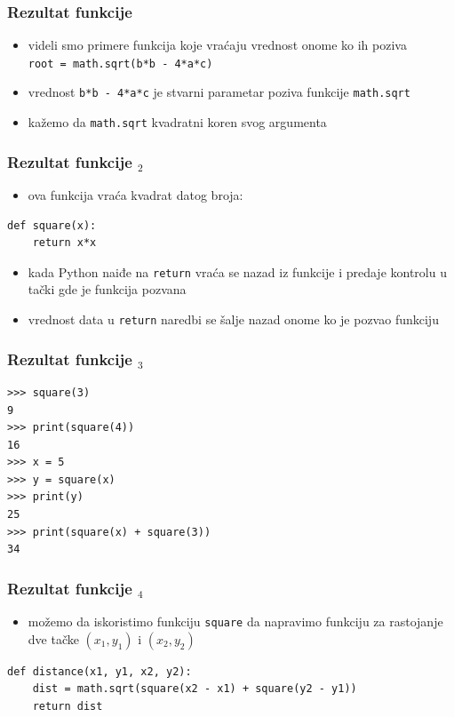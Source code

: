 \documentclass[compress]{beamer}
\begin{document}
\begin{frame}[fragile]
  \frametitle{Rezultat funkcije}
  \begin{itemize}
    \item videli smo primere funkcija koje vraćaju vrednost onome ko ih poziva \\
      \texttt{root = math.sqrt(b*b - 4*a*c)}
    \item vrednost \texttt{b*b - 4*a*c} je stvarni parametar poziva funkcije \texttt{math.sqrt}
    \item kažemo da \texttt{math.sqrt}  kvadratni koren svog argumenta
  \end{itemize}
\end{frame}

\begin{frame}[fragile]
  \frametitle{Rezultat funkcije $_2$}
  \begin{itemize}
    \item ova funkcija vraća kvadrat datog broja: \\
  \end{itemize}
\begin{verbatim}
def square(x):
    return x*x
\end{verbatim}
  \begin{itemize}
    \item kada Python naiđe na \texttt{return} vraća se nazad iz funkcije i predaje kontrolu u tački gde je funkcija pozvana
    \item vrednost data u \texttt{return} naredbi se šalje nazad onome ko je pozvao funkciju
  \end{itemize}
\end{frame}

\begin{frame}[fragile]
  \frametitle{Rezultat funkcije $_3$}
\begin{verbatim}
>>> square(3)
9
>>> print(square(4))
16
>>> x = 5
>>> y = square(x)
>>> print(y)
25
>>> print(square(x) + square(3))
34
\end{verbatim}
\end{frame}

\begin{frame}[fragile]
  \frametitle{Rezultat funkcije $_4$}
  \begin{itemize}
    \item možemo da iskoristimo funkciju \texttt{square} da napravimo funkciju za rastojanje dve tačke $(x_1,y_1)$ i $(x_2,y_2)$
  \end{itemize}
\begin{verbatim}
def distance(x1, y1, x2, y2):
    dist = math.sqrt(square(x2 - x1) + square(y2 - y1))
    return dist
\end{verbatim}
\end{frame}
\end{document}
